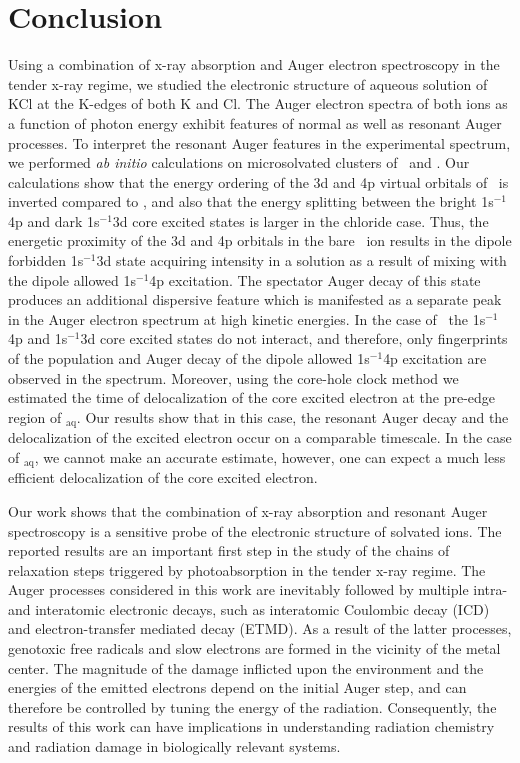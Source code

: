 \section{Conclusion}\label{sec:concl}

Using a combination of x-ray absorption and Auger electron spectroscopy in the tender x-ray regime, we studied the electronic structure of aqueous solution of KCl at the K-edges of both K and Cl. The Auger electron spectra of both ions as a function of photon energy exhibit features of normal as well as resonant Auger processes. To interpret the resonant Auger features in the experimental spectrum, we performed {\it ab initio} calculations on microsolvated clusters of \ki~and \cli. Our calculations show that the energy ordering of the 3d and 4p virtual orbitals of \cli~is inverted compared to \ki, and also that the energy splitting between the bright 1s$^{-1}$4p and dark 1s$^{-1}$3d core excited states is larger in the chloride case. Thus, the energetic proximity of the 3d and 4p orbitals in the bare \ki~ion results in the dipole forbidden 1s$^{-1}$3d state acquiring intensity in a solution as a result of mixing with the dipole allowed 1s$^{-1}$4p excitation. The spectator Auger decay of this state produces an additional dispersive feature which is manifested as a separate peak in the Auger electron spectrum at high kinetic energies. In the case of \cli~the 1s$^{-1}$4p and 1s$^{-1}$3d core excited states do not interact, and therefore, only fingerprints of the population and Auger decay of the dipole allowed 1s$^{-1}$4p excitation are observed in the spectrum. Moreover, using the core-hole clock method we estimated the time of delocalization of the core excited electron at the pre-edge region of \cli$_{\text{aq}}$. Our results show that in this case, the resonant Auger decay and the delocalization of the excited electron occur on a comparable timescale. In the case of \ki$_{\text{aq}}$, we cannot make an accurate estimate, however, one can expect a much less efficient delocalization of the core excited electron.


Our work shows that the combination of x-ray absorption and resonant Auger spectroscopy is a sensitive probe of the electronic structure of solvated ions. The reported results are an important first step in the study of the chains of relaxation steps triggered by photoabsorption in the tender x-ray regime. The Auger processes considered in this work are inevitably followed by multiple intra- and interatomic electronic decays, such as interatomic Coulombic decay (ICD) and electron-transfer mediated decay (ETMD). As a result of the latter processes, genotoxic free radicals and slow electrons are formed in the vicinity of the metal center. The magnitude of the damage inflicted upon the environment and the energies of the emitted electrons depend on the initial Auger step, and can therefore be controlled by tuning the energy of the radiation. Consequently, the results of this work can have implications in understanding radiation chemistry and radiation damage in biologically relevant systems.